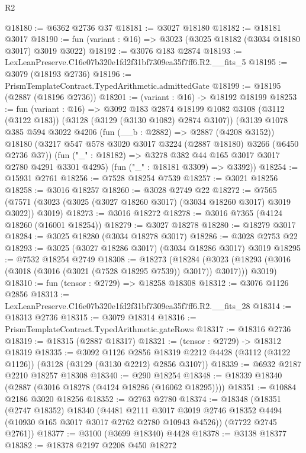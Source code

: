 \begin{lexlean}{R2}
\begin{coremodule}
@18180 := @6362 @2736 @37
@18181 := @3027 @18180
@18182 := @18181 @3017
@18190 := fun (variant : @16) => @3023 (@3025 @18182 (@3034 @18180 @3017) @3019 @3022)
@18192 := @3076 @183 @2874
@18193 := LexLeanPreserve.C16e07b320e1fd2f31bf7309ea35f7ff6.R2.__fits_5
@18195 := @3079 (@18193 @2736)
@18196 := PrismTemplateContract.TypedArithmetic.admittedGate
@18199 := @18195 (@2887 (@18196 @2736))
@18201 := (variant : @16) -> @18192 @18199
@18253 := fun (variant : @16) =>
  @3092
    @183
    @2874
    @18199
    @1082
    @3108
    (@3112 (@3122 @183))
    (@3128 (@3129 (@3130 @1082) @2874 @3107))
    (@3139
      @1078
      @385
      @594
      @3022
      @4206
      (fun (__b : @2882) => @2887 (@4208 @3152))
      @18180
      (@3217 @547 @578 @3020 @3017 @3224 (@2887 @18180) @3266 (@6450 @2736 @37))
      (fun ("_" : @18182) => @3278 @382 @44 @165 @3017 @3017 @2780 @4291 @3301 @4295)
      (fun ("_" : @18181 @3309) => @3392))
@18254 := @15931 @2761
@18256 := @7528 @18254 @7539
@18257 := @3021 @18256
@18258 := @3016 @18257
@18260 := @3028 @2749 @22
@18272 := @7565 (@7571 (@3023 (@3025 (@3027 @18260 @3017) (@3034 @18260 @3017) @3019 @3022)) @3019)
@18273 := @3016 @18272
@18278 := @3016 @7365 (@4124 @18260 (@16001 @18254))
@18279 := @3027 @18278
@18280 := @18279 @3017
@18284 := @3025 @18280 (@3034 @18278 @3017)
@18286 := @3028 @2753 @22
@18293 := @3025 (@3027 @18286 @3017) (@3034 @18286 @3017) @3019
@18295 := @7532 @18254 @2749
@18308 := @18273
    (@18284 (@3023 (@18293 (@3016 (@3018 (@3016 (@3021 (@7528 @18295 @7539)) @3017)) @3017))) @3019)
@18310 := fun (tensor : @2729) => @18258 @18308
@18312 := @3076 @1126 @2856
@18313 := LexLeanPreserve.C16e07b320e1fd2f31bf7309ea35f7ff6.R2.__fits_28
@18314 := @18313 @2736
@18315 := @3079 @18314
@18316 := PrismTemplateContract.TypedArithmetic.gateRows
@18317 := @18316 @2736
@18319 := @18315 (@2887 @18317)
@18321 := (tensor : @2729) -> @18312 @18319
@18335 := @3092
    @1126
    @2856
    @18319
    @2212
    @4428
    (@3112 (@3122 @1126))
    (@3128 (@3129 (@3130 @2212) @2856 @3107))
@18339 := @6932 @2187 @2210 @18257 @18308
@18340 := @290 @18254
@18348 := @18339 @18340 (@2887 (@3016 @18278 (@4124 @18286 (@16062 @18295))))
@18351 := @10884 @2186 @3020 @18256
@18352 := @2763 @2780
@18374 := @18348
    (@18351
      (@2747 @18352)
      @18340
      (@4481
        @2111
        @3017
        @3019
        @2746
        @18352
        @4494
        (@10930 @165 @3017 @3017 @2762 @2780 @10943 @4526))
      (@7722 @2745 @2761))
@18377 := @3100 (@3699 @18340) @4428
@18378 := @3138 @18377
@18382 := @18378 @2197 @2208 @450 @18272

\end{coremodule}
\end{lexlean}
